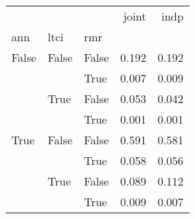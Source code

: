 \begin{tabular}{lllrr}
\toprule
     &      &      &  joint &   indp \\
ann & ltci & rmr &        &        \\
\midrule
False & False & False &  0.192 &  0.192 \\
     &      & True &  0.007 &  0.009 \\
     & True & False &  0.053 &  0.042 \\
     &      & True &  0.001 &  0.001 \\
True & False & False &  0.591 &  0.581 \\
     &      & True &  0.058 &  0.056 \\
     & True & False &  0.089 &  0.112 \\
     &      & True &  0.009 &  0.007 \\
\bottomrule
\end{tabular}
